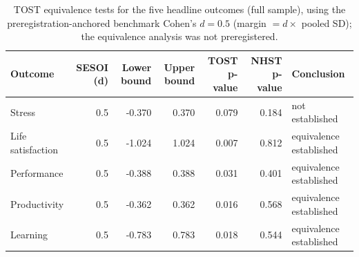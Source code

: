 \begin{table}

\caption{\label{tab:power-analysisTOST}TOST equivalence tests for the five headline outcomes (full sample), using the preregistration-anchored benchmark Cohen's $d = 0.5$ (margin $=d\times$ pooled SD); the equivalence analysis was not preregistered.}
\centering
\begin{tabular}[t]{lrrrrrl}
\toprule
Outcome & SESOI (d) & Lower bound & Upper bound & TOST p-value & NHST p-value & Conclusion\\
\midrule
Stress & 0.5 & -0.370 & 0.370 & 0.079 & 0.184 & not established\\
Life satisfaction & 0.5 & -1.024 & 1.024 & 0.007 & 0.812 & equivalence established\\
Performance & 0.5 & -0.388 & 0.388 & 0.031 & 0.401 & equivalence established\\
Productivity & 0.5 & -0.362 & 0.362 & 0.016 & 0.568 & equivalence established\\
Learning & 0.5 & -0.783 & 0.783 & 0.018 & 0.544 & equivalence established\\
\bottomrule
\end{tabular}
\end{table}
